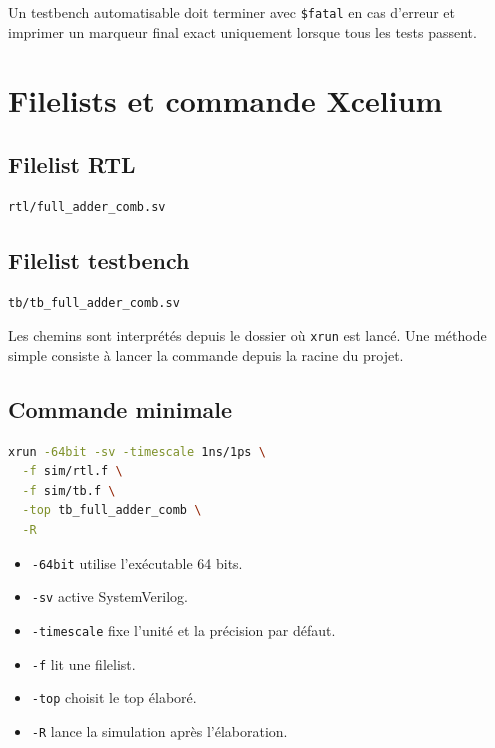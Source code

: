 \documentclass[11pt,a4paper,openany]{report}
\begin{document}
\begin{keybox}
Un testbench automatisable doit terminer avec \texttt{\$fatal} en cas d'erreur
et imprimer un marqueur final exact uniquement lorsque tous les tests passent.
\end{keybox}

\chapter{Filelists et commande Xcelium}

\section{Filelist RTL}

\begin{lstlisting}[style=guidecode,caption={rtl.f}]
rtl/full_adder_comb.sv
\end{lstlisting}

\section{Filelist testbench}

\begin{lstlisting}[style=guidecode,caption={tb.f}]
tb/tb_full_adder_comb.sv
\end{lstlisting}

Les chemins sont interprétés depuis le dossier où \texttt{xrun} est lancé.
Une méthode simple consiste à lancer la commande depuis la racine du projet.

\section{Commande minimale}

\begin{lstlisting}[style=guidecode,language=bash]
xrun -64bit -sv -timescale 1ns/1ps \
  -f sim/rtl.f \
  -f sim/tb.f \
  -top tb_full_adder_comb \
  -R
\end{lstlisting}

\begin{itemize}
  \item \texttt{-64bit} utilise l'exécutable 64 bits.
  \item \texttt{-sv} active SystemVerilog.
  \item \texttt{-timescale} fixe l'unité et la précision par défaut.
  \item \texttt{-f} lit une filelist.
  \item \texttt{-top} choisit le top élaboré.
  \item \texttt{-R} lance la simulation après l'élaboration.
\end{itemize}
\end{document}
